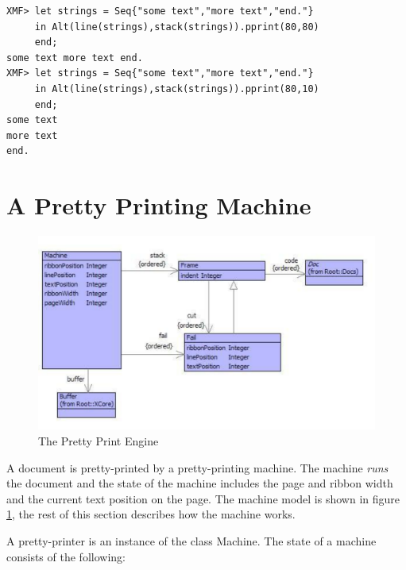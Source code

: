 \begin{lstlisting}
XMF> let strings = Seq{"some text","more text","end."}
     in Alt(line(strings),stack(strings)).pprint(80,80)
     end;
some text more text end.
XMF> let strings = Seq{"some text","more text","end."}
     in Alt(line(strings),stack(strings)).pprint(80,10)
     end;
some text
more text
end.
\end{lstlisting}
\section{A Pretty Printing Machine}

%
\begin{figure}
\begin{center}

\includegraphics[width=12cm]{Programming/PrettyPrint/Images/Engine.pdf}

\caption{The Pretty Print Engine\label{fig:The-Pretty-Print-Engine}}

\end{center}
\end{figure}


A document is pretty-printed by a pretty-printing machine. The machine
\textit{runs} the document and the state of the machine includes the
page and ribbon width and the current text position on the page. The
machine model is shown in figure \ref{fig:The-Pretty-Print-Engine},
the rest of this section describes how the machine works.

A pretty-printer is an instance of the class Machine. The state of
a machine consists of the following:

